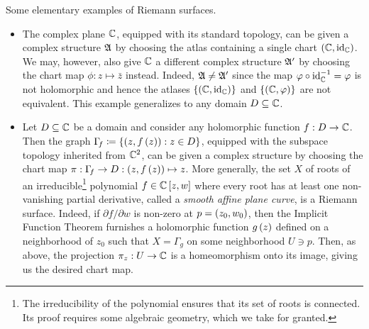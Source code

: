 \documentclass[../Moduli_Spaces_of_Riemann_Surfaces.tex]{subfiles}
\begin{document}
    \begin{example}
        Some elementary examples of Riemann surfaces.
        \begin{itemize}
            \item The complex plane $\mathbb{C}$, equipped with its standard topology, can be given a complex structure $\mathfrak{A}$ by choosing the atlas containing a single chart $\left(\mathbb{C},\operatorname{id}_{\mathbb{C}}\right)$. We may, however, also give $\mathbb{C}$ a different complex structure $\mathfrak{A}'$ by choosing the chart map $\phi:z\mapsto\bar{z}$ instead. Indeed, $\mathfrak{A}\neq\mathfrak{A}'$ since the map $\varphi\circ\operatorname{id}_{\mathbb{C}}^{-1}=\varphi$ is not holomorphic and hence the atlases $\left\{\left(\mathbb{C},\operatorname{id}_{\mathbb{C}}\right)\right\}$ and $\left\{\left(\mathbb{C},\varphi\right)\right\}$ are not equivalent. This example generalizes to any domain $D\subseteq\mathbb{C}$.
            \item Let $D\subseteq\mathbb{C}$ be a domain and consider any holomorphic function $f:D\to\mathbb{C}$. Then the graph $\Gamma\!_f\coloneqq\left\{\left(z,f\left(z\right)\right): z\in D\right\}$, equipped with the subspace topology inherited from $\mathbb{C}^2$, can be given a complex structure by choosing the chart map $\pi:\Gamma\!_f\to D:\left(z,f\left(z\right)\right)\mapsto z$. More generally, the set $X$ of roots of an irreducible\footnote{The irreducibility of the polynomial ensures that its set of roots is connected. Its proof requires some algebraic geometry, which we take for granted.} polynomial $f\in\mathbb{C}\left[z,w\right]$ where every root has at least one non-vanishing partial derivative, called a \textit{smooth affine plane curve}, is a Riemann surface. Indeed, if $\partial f/\partial w$ is non-zero at $p=\left(z_0,w_0\right)$, then the Implicit Function Theorem furnishes a holomorphic function $g\left(z\right)$ defined on a neighborhood of $z_0$ such that $X=\Gamma_{\!g}$ on some neighborhood $U\ni p$. Then, as above, the projection $\pi_z:U\to\mathbb{C}$ is a homeomorphism onto its image, giving us the desired chart map.\exqed
        \end{itemize}
    \end{example}
\end{document}
